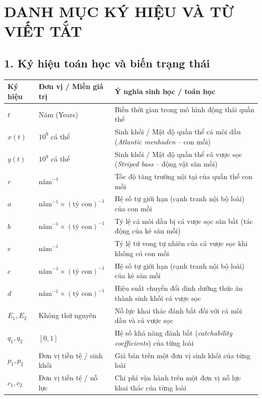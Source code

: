 \chapter*{DANH MỤC KÝ HIỆU VÀ TỪ VIẾT TẮT}

\section*{1. Ký hiệu toán học và biến trạng thái}

\begin{table}[h!]
\centering
\begin{tabularx}{\textwidth}{l l X}
\toprule
\textbf{Ký hiệu} & \textbf{Đơn vị / Miền giá trị} & \textbf{Ý nghĩa sinh học / toán học} \\
\midrule
$t$ & Năm (Years) & Biến thời gian trong mô hình động thái quần thể \\
$x(t)$ & $10^9$ cá thể & Sinh khối / Mật độ quần thể cá mòi dầu (\textit{Atlantic menhaden} -- con mồi) \\
$y(t)$ & $10^9$ cá thể & Sinh khối / Mật độ quần thể cá vược sọc (\textit{Striped bass} -- động vật săn mồi) \\
$r$ & $\text{năm}^{-1}$ & Tốc độ tăng trưởng nội tại của quần thể con mồi \\
$a$ & $\text{năm}^{-1} \times (\text{tỷ con})^{-1}$ & Hệ số tự giới hạn (cạnh tranh nội bộ loài) của con mồi \\
$b$ & $\text{năm}^{-1} \times (\text{tỷ con})^{-1}$ & Tỷ lệ cá mòi dầu bị cá vược sọc săn bắt (tác động của kẻ săn mồi) \\
$e$ & $\text{năm}^{-1}$ & Tỷ lệ tử vong tự nhiên của cá vược sọc khi không có con mồi \\
$c$ & $\text{năm}^{-1} \times (\text{tỷ con})^{-1}$ & Hệ số tự giới hạn (cạnh tranh nội bộ loài) của kẻ săn mồi \\
$d$ & $\text{năm}^{-1} \times (\text{tỷ con})^{-1}$ & Hiệu suất chuyển đổi dinh dưỡng thức ăn thành sinh khối cá vược sọc \\
$E_1, E_2$ & Không thứ nguyên & Nỗ lực khai thác đánh bắt đối với cá mòi dầu và cá vược sọc \\
$q_1, q_2$ & $[0, 1]$ & Hệ số khả năng đánh bắt (\textit{catchability coefficients}) của từng loài \\
$p_1, p_2$ & Đơn vị tiền tệ / sinh khối & Giá bán trên một đơn vị sinh khối của từng loài \\
$c_1, c_2$ & Đơn vị tiền tệ / nỗ lực & Chi phí vận hành trên một đơn vị nỗ lực khai thác của từng loài \\

\end{tabularx}
\end{table}
